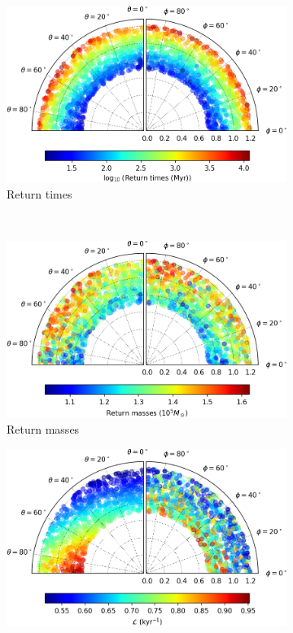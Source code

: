 \begin{figure}[h]
    \centering
    \begin{subfigure}[t]{0.4\textwidth}
        \includegraphics[width = \textwidth]{"../Files/Week 13/images/28_time"}
        \caption{Return times}
    \end{subfigure}
    ~ 
    \begin{subfigure}[t]{0.4\textwidth}
        \includegraphics[width=\textwidth]{"../Files/Week 13/images/28_mass"}
        \caption{Return masses}
    \end{subfigure}
    \begin{subfigure}[t]{0.4\textwidth}
        \includegraphics[width=\textwidth]{"../Files/Week 13/images/28_lyapunov"}

\end{subfigure}
\end{figure}
